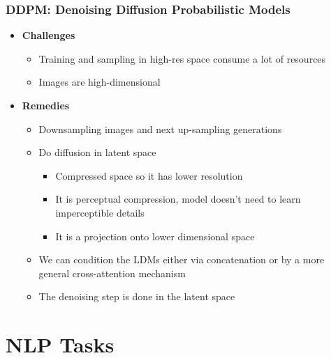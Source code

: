 \subsection{DDPM: Denoising Diffusion Probabilistic Models}
\begin{itemize}
    \item \textbf{Challenges}
    \begin{itemize}
        \item Training and sampling in high-res space consume a lot of resources
        \item Images are high-dimensional
    \end{itemize}
    \item \textbf{Remedies}
    \begin{itemize}
        \item Downsampling images and next up-sampling generations
        \item Do diffusion in latent space
        \begin{itemize}
            \item Compressed space so it has lower resolution
            \item It is perceptual compression, model doesn't need to learn imperceptible details
            \item It is a projection onto lower dimensional space
        \end{itemize}
        \item We can condition the LDMs either via concatenation or by a more general cross-attention mechanism
        \item The denoising step is done in the latent space
    \end{itemize}
\end{itemize}



\chapter{NLP Tasks}
